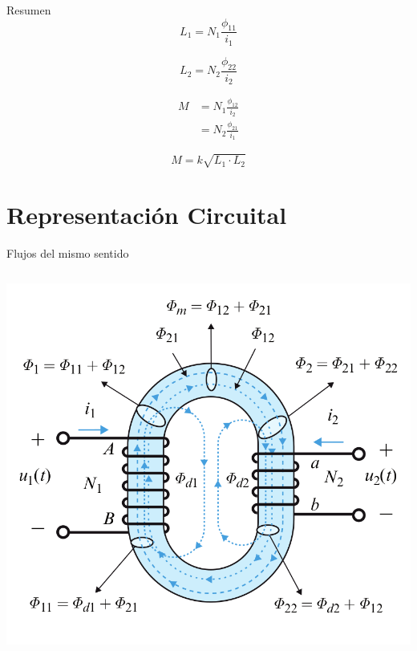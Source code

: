 \documentclass[xcolor={usenames,svgnames,dvipsnames}]{beamer}
\begin{document}
\begin{frame}[label={sec:orgaad0a13}]{Resumen}
\[
  L_1 = N_1 \frac{\phi_{11}}{i_1}
\]

\[
  L_2 = N_2 \frac{\phi_{22}}{i_2}
\]


\begin{align*}
  M &= N_1 \frac{\phi_{12}}{i_2}\\
    &= N_2 \frac{\phi_{21}}{i_1}
\end{align*}

\[
  M = k \sqrt{L_1 \cdot L_2}
\]
\end{frame}

\section{Representación Circuital}
\label{sec:org57596c8}
\begin{frame}[label={sec:org7586d4f}]{Flujos del mismo sentido}
\begin{columns}
\begin{column}{0.5\columnwidth}
\begin{center}
\includegraphics[width=.9\linewidth]{figs/Acoplamiento1.png}
\end{center}
\end{column}


\end{columns}
\end{frame}
\end{document}

